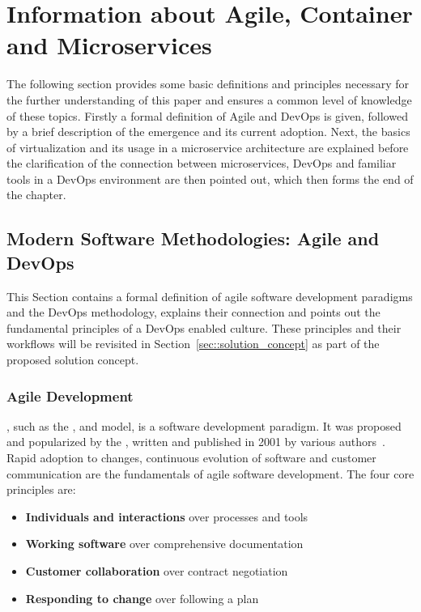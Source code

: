 
\section{Information about Agile, Container and Microservices}\label{sec::backgrund}
The following section provides some basic definitions and principles necessary for the further understanding of this paper and ensures a common level of knowledge of these topics. Firstly a formal definition of Agile and DevOps is given, followed by a brief description of the emergence and its current adoption. Next, the basics of virtualization and its usage in a microservice architecture are explained before the clarification of the connection between microservices, DevOps and familiar tools in a DevOps environment are then pointed out, which then forms the end of the chapter.

    \subsection{Modern Software Methodologies: Agile and DevOps}\label{ssec::devops}
    This Section contains a formal definition of agile software development paradigms and the DevOps methodology, explains their connection and points out the fundamental principles of a DevOps enabled culture. These principles and their workflows will be revisited in Section~\ref{sec::solution_concept} as part of the proposed solution concept.

        \subsubsection{Agile Development}
        , such as the ,  and  model, is a software development paradigm. It was proposed and popularized by the , written and published in 2001 by various authors~\cite{manifesto}. Rapid adoption to changes, continuous evolution of software and customer communication are the fundamentals of agile software development.\newline
        The four core principles are:

        \begin{itemize}[label=\(\star\)]
            \setlength\itemsep{0em}
            \item \textbf{Individuals and interactions} over processes and tools
            \item \textbf{Working software} over comprehensive documentation
            \item \textbf{Customer collaboration} over contract negotiation
            \item \textbf{Responding to change} over following a plan
        \end{itemize}

